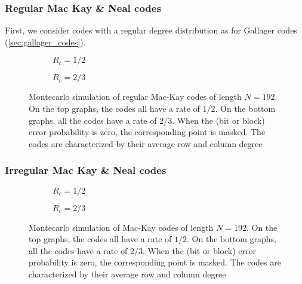 \subsubsection{Regular Mac Kay \& Neal codes}
First, we consider codes with a regular degree distribution as for Gallager
codes (\autoref{sec:gallager_codes}).

\begin{figure}
    \centering
    \begin{subfigure}{\textwidth}
        \centering
        
        \caption{$R_c = 1/2$}
    \end{subfigure}%

    \begin{subfigure}{\textwidth}
        \centering
        
        \caption{$R_c = 2/3$}
    \end{subfigure}%
    \caption[Montecarlo simulation of regular Mac-Kay codes of length $N = 192$]{%
        Montecarlo simulation of regular Mac-Kay codes of length $N = 192$. On the top
        graphs, the codes all have a rate of $1/2$. On the bottom graphs, all
        the codes have a rate of $2/3$. When the (bit or block) error
        probability is zero, the corresponding point is masked. The codes are
        characterized by their average row and column degree%
    }
    \label{fig:mackay_regular_bmc}
\end{figure}

\subsubsection{Irregular Mac Kay \& Neal codes}

\begin{figure}
    \centering
    \begin{subfigure}{\textwidth}
        \centering
        
        \caption{$R_c = 1/2$}
    \end{subfigure}%

    \begin{subfigure}{\textwidth}
        \centering
        
        \caption{$R_c = 2/3$}
    \end{subfigure}%
    \caption[Montecarlo simulation of Mac-Kay codes of length $N = 192$]{%
        Montecarlo simulation of Mac-Kay codes of length $N = 192$. On the top
        graphs, the codes all have a rate of $1/2$. On the bottom graphs, all
        the codes have a rate of $2/3$. When the (bit or block) error
        probability is zero, the corresponding point is masked. The codes are
        characterized by their average row and column degree%
    }
    \label{fig:mackay_bmc}
\end{figure}


